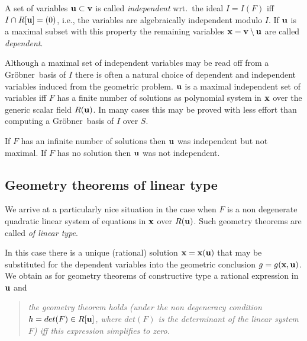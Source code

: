 \documentclass{article}
\newcommand{\iks}{{\bf x}}
\newcommand{\uhh}{{\bf u}}
\newcommand{\vau}{{\bf v}}
\newcommand{\gr}{{Gr\"obner}}
\begin{document}
A set of variables $\uhh\subset\vau$ is called {\em independent} wrt.\
the ideal $I=I(F)$ iff $I\cap R[\uhh]=(0)$, i.e., the variables are
algebraically independent modulo $I$. If $\uhh$ is a maximal subset
with this property the remaining variables $\iks=\vau\setminus\uhh$
are called {\em dependent}.

Although a maximal set of independent variables may be read off from a
\gr\ basis of $I$ there is often a natural choice of dependent and
independent variables induced from the geometric problem. $\uhh$ is a
maximal independent set of variables iff $F$ has a finite number of
solutions as polynomial system in $\iks$ over the generic scalar field
$R(\uhh)$. In many cases this may be proved with less effort than
computing a \gr\ basis of $I$ over $S$.

If $F$ has an infinite number of solutions then $\uhh$ was independent
but not maximal. If $F$ has no solution then $\uhh$ was not
independent. 

\subsection{Geometry theorems of linear type}

We arrive at a particularly nice situation in the case when $F$ is a
non degenerate quadratic linear system of equations in $\iks$ over
$R(\uhh)$. Such geometry theorems are called {\em of linear type}.

In this case there is a unique (rational) solution $\iks = \iks(\uhh)$
that may be substituted for the dependent variables into the geometric
conclusion $g=g(\iks,\uhh)$. We obtain as for geometry theorems of
constructive type a rational expression in $\uhh$ and 
\begin{quote}\it
the geometry theorem holds (under the non degeneracy condition
$h=det(F)\in R[\uhh]$, where $det(F)$ is the determinant of the linear
system $F$) iff this expression simplifies to zero.
\end{quote}
\end{document}
